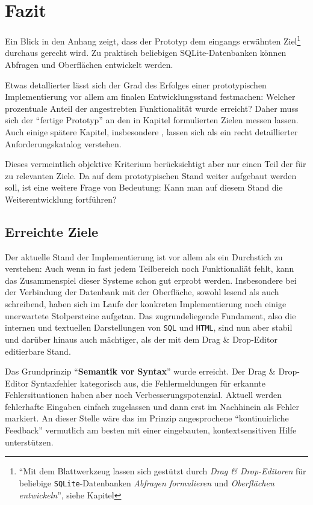 \section{Fazit}
\label{sec:conclusion}

Ein Blick in den Anhang zeigt, dass der Prototyp dem eingangs erwähnten Ziel\footnote{"`Mit dem Blattwerkzeug lassen sich gestützt durch \textit{Drag \& Drop-Editoren} für beliebige \texttt{SQLite}-Datenbanken \textit{Abfragen formulieren} und \textit{Oberflächen entwickeln}"', siehe Kapitel } durchaus gerecht wird. Zu praktisch beliebigen SQLite-Datenbanken können Abfragen und Oberflächen entwickelt werden.

Etwas detallierter lässt sich der Grad des Erfolges einer prototypischen Implementierung vor allem am finalen Entwicklungsstand festmachen: Welcher prozentuale Anteil der angestrebten Funktionalität wurde erreicht? Daher muss sich der "`fertige Prototyp"' an den in Kapitel  formulierten Zielen messen lassen. Auch einige spätere Kapitel, insbesondere , lassen sich als ein recht detaillierter Anforderungskatalog verstehen.

Dieses vermeintlich objektive Kriterium berücksichtigt aber nur einen Teil der für \idename{} zu relevanten Ziele. Da auf dem prototypischen Stand weiter aufgebaut werden soll, ist eine weitere Frage von Bedeutung: Kann man auf diesem Stand die Weiterentwicklung fortführen?

\subsection{Erreichte Ziele}

Der aktuelle Stand der Implementierung ist vor allem als ein Durchstich zu verstehen: Auch wenn in fast jedem Teilbereich noch Funktionaliät fehlt, kann das Zusammenspiel dieser Systeme schon gut erprobt werden. Insbesondere bei der Verbindung der Datenbank mit der Oberfläche, sowohl lesend als auch schreibend, haben sich im Laufe der konkreten Implementierung noch einige unerwartete Stolpersteine aufgetan. Das zugrundeliegende Fundament, also die internen und textuellen Darstellungen von \texttt{SQL} und \texttt{HTML}, sind nun aber stabil und darüber hinaus auch mächtiger, als der mit dem Drag \& Drop-Editor editierbare Stand.

Das Grundprinzip "`\textbf{Semantik vor Syntax}"' wurde erreicht. Der Drag \& Drop-Editor Syntaxfehler kategorisch aus, die Fehlermeldungen für erkannte Fehlersituationen haben aber noch Verbesserungspotenzial. Aktuell werden fehlerhafte Eingaben einfach zugelassen und dann erst im Nachhinein als Fehler markiert. An dieser Stelle wäre das im Prinzip angesprochene "`kontinuirliche Feedback"' vermutlich am besten mit einer eingebauten, kontextsensitiven Hilfe unterstützen.

